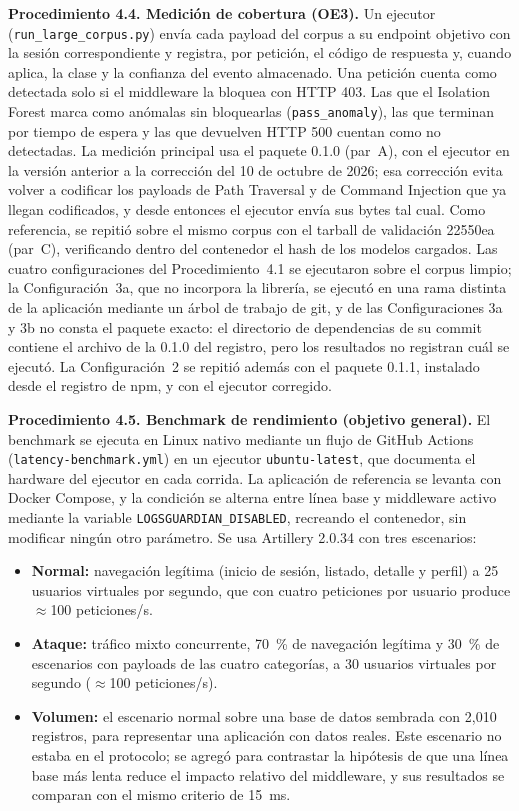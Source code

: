 \textbf{Procedimiento 4.4. Medición de cobertura (OE3).} Un ejecutor (\texttt{run\_large\_corpus.py})
envía cada payload del corpus a su endpoint objetivo con la sesión correspondiente y registra, por
petición, el código de respuesta y, cuando aplica, la clase y la confianza del evento almacenado.
Una petición cuenta como detectada solo si el middleware la bloquea con HTTP 403. Las que el
Isolation Forest marca como anómalas sin bloquearlas (\texttt{pass\_anomaly}), las que terminan por
tiempo de espera y las que devuelven HTTP 500 cuentan como no detectadas. La medición principal usa
el paquete 0.1.0 (par~A), con el ejecutor en la versión anterior a la corrección del 10 de octubre
de 2026; esa corrección evita volver a codificar los payloads de Path Traversal y de Command
Injection que ya llegan codificados, y desde entonces el ejecutor envía sus bytes tal cual. Como
referencia, se repitió sobre el mismo corpus con el tarball de
validación 22550ea (par~C), verificando dentro del contenedor el hash de los modelos cargados. Las
cuatro configuraciones del Procedimiento~4.1 se ejecutaron sobre el corpus limpio; la
Configuración~3a, que no incorpora la librería, se ejecutó en una rama distinta de la aplicación
mediante un árbol de trabajo de git, y de las Configuraciones 3a y 3b no consta el paquete exacto: el directorio de dependencias
de su commit contiene el archivo de la 0.1.0 del registro, pero los resultados no registran cuál
se ejecutó. La Configuración~2 se repitió además con el paquete 0.1.1, instalado desde el registro de npm, y con
el ejecutor corregido.

\textbf{Procedimiento 4.5. Benchmark de rendimiento (objetivo general).} El benchmark se ejecuta
en Linux nativo mediante un flujo de GitHub Actions (\texttt{latency-benchmark.yml}) en un
ejecutor \texttt{ubuntu-latest}, que documenta el hardware del ejecutor en cada corrida. La
aplicación de referencia se levanta con Docker Compose, y la condición se alterna entre línea
base y middleware activo mediante la variable \texttt{LOGSGUARDIAN\_DISABLED}, recreando el
contenedor, sin modificar ningún otro parámetro. Se usa Artillery 2.0.34 \cite{artillerydocs}
con tres escenarios:

\begin{itemize}
    \item \textbf{Normal:} navegación legítima (inicio de sesión, listado, detalle y perfil) a
    25 usuarios virtuales por segundo, que con cuatro peticiones por usuario produce
    $\approx$100 peticiones/s.
    \item \textbf{Ataque:} tráfico mixto concurrente, 70~\% de navegación legítima y 30~\% de
    escenarios con payloads de las cuatro categorías, a 30 usuarios virtuales por segundo
    ($\approx$100 peticiones/s).
    \item \textbf{Volumen:} el escenario normal sobre una base de datos sembrada con 2{,}010
    registros, para representar una aplicación con datos reales. Este escenario no estaba en el
    protocolo; se agregó para contrastar la hipótesis de que una línea base más lenta reduce el
    impacto relativo del middleware, y sus resultados se comparan con el mismo criterio de 15~ms.
\end{itemize}

